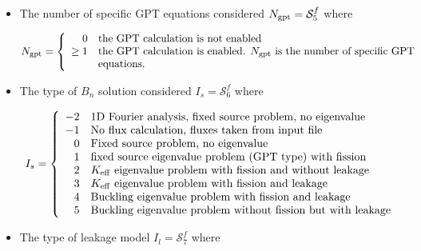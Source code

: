 \begin{itemize}
\item The number of specific GPT equations considered $N_{\rm gpt}=\mathcal{S}^{f}_{5}$ where

\begin{displaymath}
N_{\rm gpt} = \left\{
\begin{array}{rl}
 0 & \textrm{the GPT calculation is not enabled} \\
 \ge 1 & \textrm{the GPT calculation is enabled. $N_{\rm gpt}$ is the number of specific GPT} \\
  & \textrm{equations.} \\
\end{array} \right.
\end{displaymath}

\item The type of $B_n$ solution considered $I_{s}=\mathcal{S}^{f}_{6}$ where

\begin{displaymath}
I_{s} = \left\{
\begin{array}{rl}
-2 & \textrm{1D Fourier analysis, fixed source problem, no eigenvalue}\\
-1 & \textrm{No flux calculation, fluxes taken from input file}\\
 0 & \textrm{Fixed source problem, no eigenvalue} \\
 1 & \textrm{fixed source eigenvalue problem (GPT type) with fission} \\
 2 & \textrm{\ensuremath{K_{\mathrm{eff}}}{} eigenvalue problem with fission and without leakage} \\
 3 & \textrm{\ensuremath{K_{\mathrm{eff}}}{} eigenvalue problem with fission and leakage } \\
 4 & \textrm{Buckling eigenvalue problem with fission and leakage} \\
 5 & \textrm{Buckling eigenvalue problem without fission but with leakage} 
\end{array} \right.
\end{displaymath}

\item The type of leakage model $I_{l}=\mathcal{S}^{f}_{7}$ where


\end{itemize}
